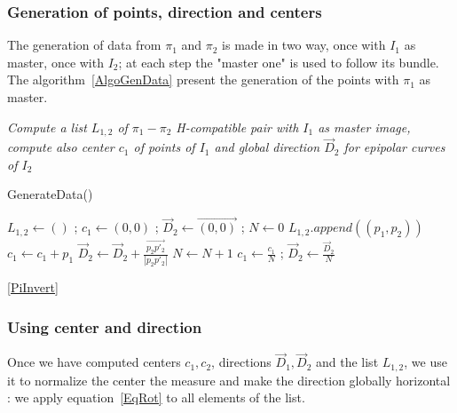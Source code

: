 \documentclass{ipol}
\newcommand{\PiVert}{\widetilde{\pi}}
\begin{document}
\subsubsection{Generation of points, direction and centers}

The generation of  data from $\pi_1$ and $\pi_2$  is made
in two way, once with $I_1$ as master, once with $I_2$;
at each step the  "master one" is 
used to follow its bundle. The algorithm~\ref{AlgoGenData} present the 
generation of the points with $\pi_1$  as master.

\begin{algorithm}
\emph{Compute a list $L_{1,2}$  of   $\pi_1-\pi_2$ H-compatible pair with $I_1$ as master image,
  compute also center $c_1$ of points of $I_1$  and global direction $\vec{D}_2$ for epipolar curves of $I_2$}
\caption{GenerateData()}
\begin{algorithmic}
    \STATE $L_{1,2}\gets () $ ;  $c_1 \gets (0,0)$  ;   $\vec{D}_2 \gets  \overrightarrow{(0,0)}$ ; $N \gets 0 $
                  \STATE {$p_2 = \pi_2(\PiVert^{-1}_1(p_1,Z))$}
                  \STATE {$p'_2 = \pi_2(\PiVert^{-1}_1(p_1,Z+\delta_{z}))$}
                       \STATE $L_{1,2}.append((p_1,p_2))$  
                       \STATE $c_1 \gets c_1 + p_1$
                       \STATE $\vec{D}_2 \gets  \vec{D}_2 + \frac{\overrightarrow{p_2 p'_2}}{|p_2 p'_2|}$
                       \STATE $N \gets  N +1 $
                  \ENDIF
             \ENDFOR
        \ENDFOR
    \ENDFOR
    $c_1 \gets \frac{c_1}{N}$  ; $\vec{D}_2 \gets \frac{\vec{D}_2}{N} $
\end{algorithmic}
\label{AlgoGenData}
\end{algorithm}

\ref{PiInvert}


\subsubsection{Using center and direction}

Once we have computed centers $c_1,c_2$, directions   $\vec{D}_1,\vec{D}_2$  and the list $L_{1,2}$,
we use it  to normalize the center the measure and make the direction globally
horizontal : we apply equation~\ref{EqRot}  to all elements of the list.
\end{document}
